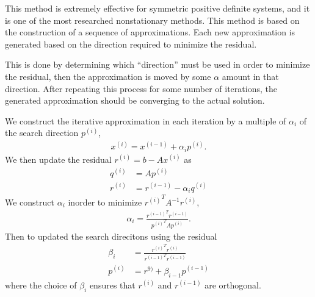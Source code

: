 \documentclass[../fem.tex]{subfile}
\begin{document}
This method is extremely effective for symmetric positive definite systems, and
it is one of the most researched nonstationary methods. This method is based on
the construction of a sequence of approximations. Each new approximation is
generated based on the direction required to minimize the residual.

%      

This is done by determining which ``direction'' must be used in order to
minimize the residual, then the approximation is moved by some $\alpha$ amount
in that direction. After repeating this process for some number of iterations,
the generated approximation should be converging to the actual solution.

%      

We construct the iterative approximation in each iteration by a multiple of
$\alpha_i$ of the search direction $p^{(i)}$,
\begin{align*}
  x^{(i)}=x^{(i-1)}+\alpha_ip^{(i)}.
\end{align*}
We then update the residual $r^{(i)}=b-Ax^{(i)}$ as
\begin{align*}
  q^{(i)}&=Ap^{(i)}\\
  r^{(i)}&=r^{(i-1)}-\alpha_i q^{(i)}
\end{align*}
We construct $\alpha_i$ inorder to minimize ${r^{(i)}}^TA^{-1}r^{(i)}$,
\begin{align*}
  \alpha_i=\frac{{r^{(i-1)}}^Tr^{(i-1)}}{{p^{(i)}}^TAp^{(i)}}.
\end{align*}
Then to updated the search direcitons using the residual
\begin{align*}
  \beta_i&=\frac{{r^{(i)}}^Tr^{(i)}}{{r^{(i-1)}}^Tr^{(i-1)}}\\
  p^{(i)}&=r^{9)}+\beta_{i-1}p^{(i-1)}
\end{align*}
where the choice of $\beta_i$ ensures that $r^{(i)}$ and $r^{(i-1)}$ are
orthogonal.
\end{document}
